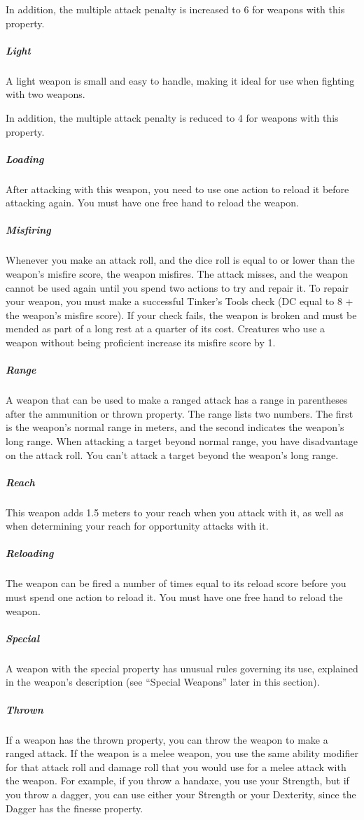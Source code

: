         In addition, the multiple attack penalty is increased to 6 for weapons with this property.
    \subparagraph{Light}
        A light weapon is small and easy to handle, making it ideal for use when fighting with two weapons.

        In addition, the multiple attack penalty is reduced to 4 for weapons with this property.
    \subparagraph{Loading}
        After attacking with this weapon, you need to use one action to reload it before attacking again.
        You must have one free hand to reload the weapon.
    \subparagraph{Misfiring}
        Whenever you make an attack roll, and the dice roll is equal to or lower than the weapon’s misfire score, the weapon misfires.
        The attack misses, and the weapon cannot be used again until you spend two actions to try and repair it.
        To repair your weapon, you must make a successful Tinker’s Tools check (DC equal to 8 + the weapon's misfire score).
        If your check fails, the weapon is broken and must be mended as part of a long rest at a quarter of its cost.
        Creatures who use a weapon without being proficient increase its misfire score by 1.
    \subparagraph{Range}
        A weapon that can be used to make a ranged attack has a range in parentheses after the ammunition or thrown property.
        The range lists two numbers.
        The first is the weapon’s normal range in meters, and the second indicates the weapon’s long range.
        When attacking a target beyond normal range, you have disadvantage on the attack roll.
        You can’t attack a target beyond the weapon’s long range.
    \subparagraph{Reach}
        This weapon adds 1.5 meters to your reach when you attack with it, as well as when determining your reach for opportunity attacks with it.
    \subparagraph{Reloading}
        The weapon can be fired a number of times equal to its reload score before you must spend one action to reload it.
        You must have one free hand to reload the weapon.
    \subparagraph{Special}
        A weapon with the special property has unusual rules governing its use, explained in the weapon’s description (see ``Special Weapons'' later in this section).
    \subparagraph{Thrown}
        If a weapon has the thrown property, you can throw the weapon to make a ranged attack.
        If the weapon is a melee weapon, you use the same ability modifier for that attack roll and damage roll that you would use for a melee attack with the weapon.
        For example, if you throw a handaxe, you use your Strength, but if you throw a dagger, you can use either your Strength or your Dexterity, since the Dagger has the finesse property.
